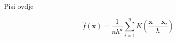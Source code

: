 \documentclass{article}
\begin{document}
Pisi ovdje


\begin{equation} \label{eq:3-A3}
\hat{f}(\mathbf{x}) = \frac{1}{nh^d} \sum_{i=1}^{n}{ K (\frac{\mathbf{x}-\mathbf{x}_i}{h})}
\end{equation}
\end{document}
